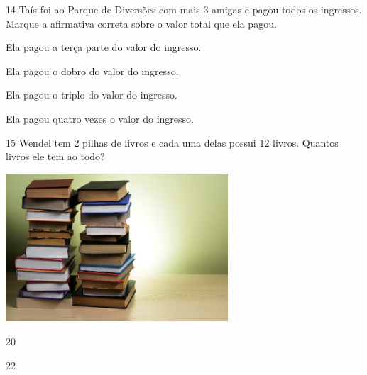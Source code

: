 \begin{escolha}
\begin{escolha}
\num{14} Taís foi ao Parque de Diversões com mais 3 amigas e pagou todos os ingressos. Marque a afirmativa correta sobre o valor total que ela pagou.

\begin{escolha}
\item Ela pagou a terça parte do valor do ingresso.

\item Ela pagou o dobro do valor do ingresso.

\item Ela pagou o triplo do valor do ingresso.

\item Ela pagou quatro vezes o valor do ingresso.
\end{escolha}



\num{15} Wendel tem 2 pilhas de livros e cada uma delas possui 12 livros. Quantos livros ele tem ao todo?

\includegraphics[width=3.26042in,height=2.17361in]{media/image124.jpeg}


\begin{minipage}{.5\textwidth}
\begin{escolha}
\item 20

\item 22


\end{escolha}
\end{minipage}
\end{escolha}
\end{escolha}
